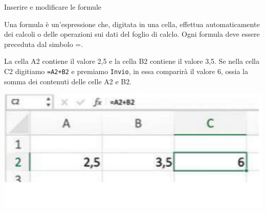 \documentclass[12pt,a4paper,oneside]{book}
\makeatletter
\newcounter{testexample} %
\renewcommand{\subsection}{\@startsection {subsection}{2}{\z@}
{-3ex \@plus -0.1ex \@minus -.4ex}
{0.5ex \@plus.2ex }
{\color[rgb]{0.141,0.596,0.749}\normalfont\sffamily\bfseries}}
\theoremstyle{esercizio}
\makeatother
\begin{document}
\subsection{Inserire e modificare le formule}

\begin{definizione}
Una formula è un'espressione che, digitata in una cella,
 effettua automaticamente dei calcoli o delle operazioni sui dati del 
 foglio di calclo. Ogni formula deve essere preceduta dal simbolo =.
\end{definizione}

















\begin{testexample}

La cella A2 contiene il valore 2,5 e la cella B2 contiene
 il valore 3,5. Se nella cella C2 digitiamo \texttt{=A2+B2} e premiamo \texttt{Invio}, 
 in essa comparirà il valore 6,
 ossia la somma dei contenuti delle celle A2 e B2.

 \begin{minipage}{\linewidth}
	\centering
    \includegraphics[scale=0.4]{img/inserimento-formula.png} 
    \label{fig:esempioformule}\end{minipage}
\end{testexample}
\end{document}
